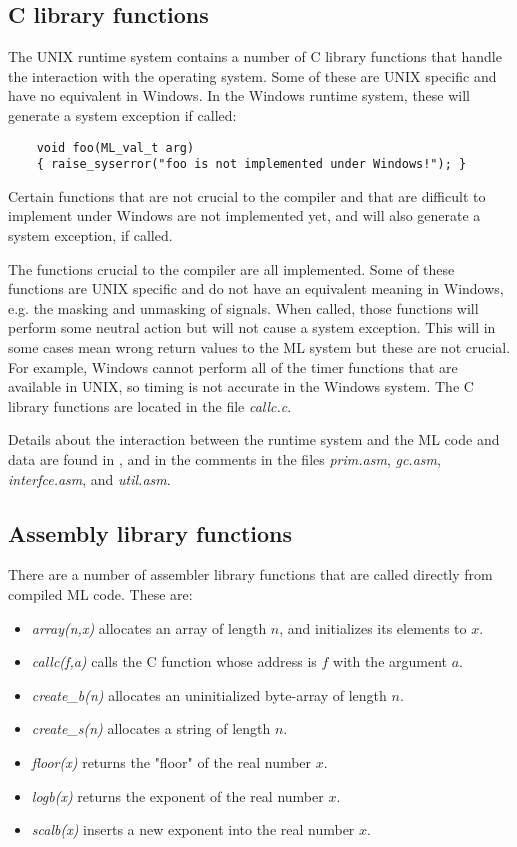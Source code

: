 \subsection{C library functions}

The UNIX runtime system contains a number of C library functions that
handle the interaction with the operating system. Some of these are
UNIX specific and have no equivalent in Windows. In the Windows
runtime system, these will generate a system exception if called:
\begin{verbatim}
    void foo(ML_val_t arg)
    { raise_syserror("foo is not implemented under Windows!"); }
\end{verbatim}

Certain functions that are not crucial to the compiler and that are
difficult to implement under Windows are not implemented yet, and will
also generate a system exception, if called.

The functions crucial to the compiler are all implemented. Some of
these functions are UNIX specific and do not have an equivalent
meaning in Windows, e.g. the masking and unmasking of signals. When
called, those functions will perform some neutral action but will not
cause a system exception. This will in some cases mean wrong return
values to the ML system but these are not crucial. For example,
Windows cannot perform all of the timer functions that are available
in UNIX, so timing is not accurate in the Windows system. The C
library functions are located in the file {\em callc.c\/}.

Details about the interaction between the runtime system and the ML
code and data are found in \cite{bib:ysgsml}, and in the comments in
the files {\em prim.asm\/}, {\em gc.asm\/}, {\em interfce.asm\/}, and
{\em util.asm\/}.

\subsection{Assembly library functions}

There are a number of assembler library functions that are called
directly from compiled ML code. These are:
\begin{itemize}
\item {\em array(n,x)\/} allocates an array of length $n$, and initializes
 its elements to $x$.
\item {\em callc(f,a)\/} calls the C function whose address is $f$ with
 the argument $a$.
\item {\em create\_b(n)\/} allocates an uninitialized byte-array of length
 $n$.
\item {\em create\_s(n)\/} allocates a string of length $n$.
\item {\em floor(x)\/} returns the "floor" of the real number $x$.
\item {\em logb(x)\/} returns the exponent of the real number $x$.
\item {\em scalb(x)\/} inserts a new exponent into the real number $x$.
\end{itemize}


